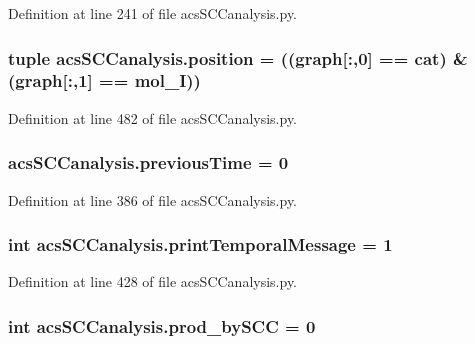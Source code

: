 Definition at line 241 of file acs\-S\-C\-Canalysis.\-py.

\hypertarget{a00096_ac09e85f8df5b7c8c7d2caf87e9193421}{
\subsubsection[{position}]{\setlength{\rightskip}{0pt plus 5cm}tuple acs\-S\-C\-Canalysis.\-position = (({\bf graph}\mbox{[}\-:,0\mbox{]} == {\bf cat}) \& ({\bf graph}\mbox{[}\-:,1\mbox{]} == {\bf mol\-\_\-\-I}))}}\label{a00096_ac09e85f8df5b7c8c7d2caf87e9193421}


Definition at line 482 of file acs\-S\-C\-Canalysis.\-py.

\hypertarget{a00096_aff96a31e98ac46cb47a67b74f5d87351}{
\subsubsection[{previous\-Time}]{\setlength{\rightskip}{0pt plus 5cm}acs\-S\-C\-Canalysis.\-previous\-Time = 0}}\label{a00096_aff96a31e98ac46cb47a67b74f5d87351}


Definition at line 386 of file acs\-S\-C\-Canalysis.\-py.

\hypertarget{a00096_a3de1ee32e24403b152d565d8c52cf7fd}{
\subsubsection[{print\-Temporal\-Message}]{\setlength{\rightskip}{0pt plus 5cm}int acs\-S\-C\-Canalysis.\-print\-Temporal\-Message = 1}}\label{a00096_a3de1ee32e24403b152d565d8c52cf7fd}


Definition at line 428 of file acs\-S\-C\-Canalysis.\-py.

\hypertarget{a00096_abb2ac92624837ae48b882d145c5aab11}{
\subsubsection[{prod\-\_\-by\-S\-C\-C}]{\setlength{\rightskip}{0pt plus 5cm}int acs\-S\-C\-Canalysis.\-prod\-\_\-by\-S\-C\-C = 0}}\label{a00096_abb2ac92624837ae48b882d145c5aab11}


